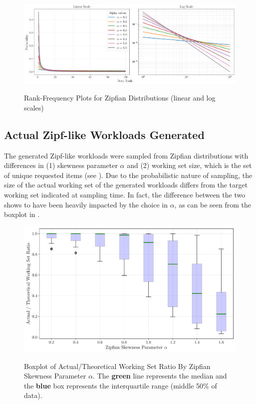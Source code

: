 \begin{figure}[h!]
    \centering
    \caption{Rank-Frequency Plots for Zipfian Distributions (linear and log scales)}
    \includegraphics[width=\linewidth]{figures/workloads/zipfian_curves_all_both_no_title.pdf}
    \label{fig:zipf-alpha}
\end{figure}

\subsection{Actual Zipf-like Workloads Generated}

The generated Zipf-like workloads were sampled from Zipfian distributions with differences in (1) skewness parameter $\alpha$ and (2) working set size, which is the set of unique requested items (see ). Due to the probabilistic nature of sampling, the size of the actual working set of the generated workloads differs from the target working set indicated at sampling time. In fact, the difference between the two shows to have been heavily impacted by the choice in $\alpha$, as can be seen from the boxplot in .

\begin{figure}[h!]
    \centering
    \captionsetup{justification=centering}
    \caption{Boxplot of Actual/Theoretical Working Set Ratio By Zipfian Skewness Parameter $\alpha$. The {\color{PineGreen}\textbf{green}} line represents the median and the {\color{blue}\textbf{blue}} box represents the interquartile range (middle 50\% of data).}
    \includegraphics[width=0.8\linewidth]{figures/workloads/boxplot_alpha_vs_actual_theoretical_ratio.pdf}
    \label{fig:boxplot-actual-theoretical-ratio}
\end{figure}

